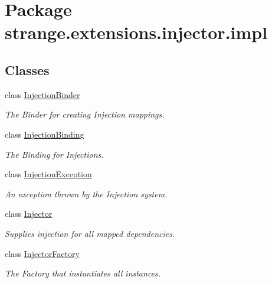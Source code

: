 \hypertarget{namespacestrange_1_1extensions_1_1injector_1_1impl}{\section{Package strange.\-extensions.\-injector.\-impl}
\label{namespacestrange_1_1extensions_1_1injector_1_1impl}
}
\subsection*{Classes}
\begin{DoxyCompactItemize}
\item 
class \hyperlink{classstrange_1_1extensions_1_1injector_1_1impl_1_1_injection_binder}{Injection\-Binder}
\begin{DoxyCompactList}\small\item\em The Binder for creating Injection mappings. \end{DoxyCompactList}\item 
class \hyperlink{classstrange_1_1extensions_1_1injector_1_1impl_1_1_injection_binding}{Injection\-Binding}
\begin{DoxyCompactList}\small\item\em The Binding for Injections. \end{DoxyCompactList}\item 
class \hyperlink{classstrange_1_1extensions_1_1injector_1_1impl_1_1_injection_exception}{Injection\-Exception}
\begin{DoxyCompactList}\small\item\em An exception thrown by the Injection system. \end{DoxyCompactList}\item 
class \hyperlink{classstrange_1_1extensions_1_1injector_1_1impl_1_1_injector}{Injector}
\begin{DoxyCompactList}\small\item\em Supplies injection for all mapped dependencies. \end{DoxyCompactList}\item 
class \hyperlink{classstrange_1_1extensions_1_1injector_1_1impl_1_1_injector_factory}{Injector\-Factory}
\begin{DoxyCompactList}\small\item\em The Factory that instantiates all instances. \end{DoxyCompactList}\end{DoxyCompactItemize}
